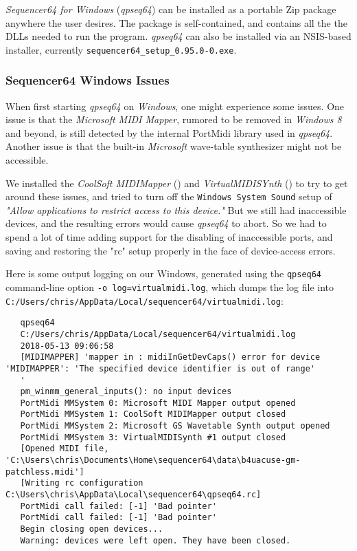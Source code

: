    \textsl{Sequencer64 for Windows} (\textsl{qpseq64}) can be installed
   as a portable Zip package anywhere the user desires.  The package is
   self-contained, and contains all the the DLLs needed to run the program.
   \textsl{qpseq64} can also be installed via an NSIS-based installer,
   currently \texttt{sequencer64\_setup\_0.95.0-0.exe}.

\subsubsection{Sequencer64 Windows Issues}
\label{subsubsec:qt_portmidi_windows_setup_issues}

    When first starting \textsl{qpseq64} on \textsl{Windows}, one might
    experience some issues.  One issue is that the \textsl{Microsoft MIDI
    Mapper}, rumored to be removed in \textsl{Windows 8} and beyond, is still
    detected by the internal PortMidi library used in \textsl{qpseq64}.
    Another issue is that the built-in \textsl{Microsoft} wave-table
    synthesizer might not be accessible.

    We installed the
    \textsl{CoolSoft MIDIMapper} (\cite{midimapper}) and
    \textsl{VirtualMIDISYnth} (\cite{midisynth}) to try to get
    around these issues, and tried to turn off the
    \texttt{Windows System Sound} setup of
    \textsl{"Allow applications to restrict access to this device."}
    But we still had
    inaccessible devices, and the resulting errors would cause
    \textsl{qpseq64} to
    abort.  So we had to spend a lot of time adding support for
    the disabling of
    inaccessible ports, and saving and restoring the "rc" setup properly
    in the face of device-access errors.

    Here is some output logging on our Windows, generated using the
    \texttt{qpseq64} command-line option
    \texttt{-o log=virtualmidi.log},
    which dumps the log file into
    \texttt{C:/Users/chris/AppData/Local/sequencer64/virtualmidi.log}:

\begin{verbatim}
   qpseq64 
   C:/Users/chris/AppData/Local/sequencer64/virtualmidi.log 
   2018-05-13 09:06:58 
   [MIDIMAPPER] 'mapper in : midiInGetDevCaps() error for device 'MIDIMAPPER': 'The specified device identifier is out of range'
   '
   pm_winmm_general_inputs(): no input devices
   PortMidi MMSystem 0: Microsoft MIDI Mapper output opened
   PortMidi MMSystem 1: CoolSoft MIDIMapper output closed
   PortMidi MMSystem 2: Microsoft GS Wavetable Synth output opened
   PortMidi MMSystem 3: VirtualMIDISynth #1 output closed
   [Opened MIDI file, 'C:\Users\chris\Documents\Home\sequencer64\data\b4uacuse-gm-patchless.midi']
   [Writing rc configuration C:\Users\chris\AppData\Local\sequencer64\qpseq64.rc]
   PortMidi call failed: [-1] 'Bad pointer'
   PortMidi call failed: [-1] 'Bad pointer'
   Begin closing open devices...
   Warning: devices were left open. They have been closed.
\end{verbatim}

